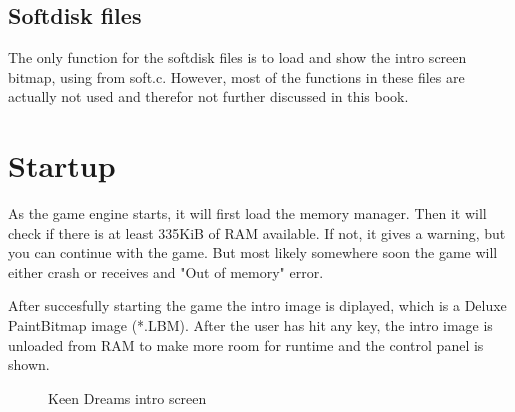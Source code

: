 \documentclass[book.tex]{subfiles}
\begin{document}
\subsection{Softdisk files}
The only function for the softdisk files is to load and show the intro screen bitmap, using  from soft.c. However, most of the functions in these files are actually not used and therefor not further discussed in this book.
\pagebreak



\section{Startup}
As the game engine starts, it will first load the memory manager. Then it will check if there is at least 335KiB of RAM available. If not, it gives  a warning, but you can continue with the game. But most likely somewhere soon the game will either crash or receives and "Out of memory" error.\\
\par
After succesfully starting the game the intro image is diplayed, which is a Deluxe PaintBitmap image (*.LBM). After the user has hit any key, the intro image is unloaded from RAM to make more room for runtime and the control panel is shown.\\
\begin{figure}[H]
\centering
{}
\caption{Keen Dreams intro screen}
\end{figure}
\pagebreak
\end{document}
